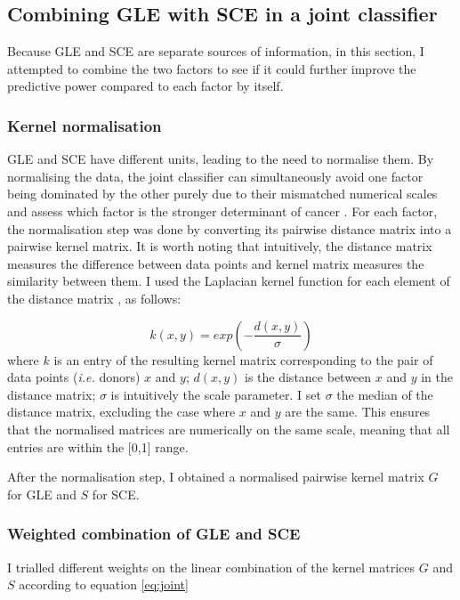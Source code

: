 \subsection{Combining GLE with SCE in a joint classifier}
Because GLE and SCE are separate sources of information, in this section, I attempted to combine the two factors to see if it could further improve the predictive power compared to each factor by itself.

\subsubsection{Kernel normalisation}
GLE and SCE have different units, leading to the need to normalise them. By normalising the data, the joint classifier can simultaneously avoid one factor being dominated by the other purely due to their mismatched numerical scales and assess which factor is the stronger determinant of cancer . For each factor, the normalisation step was done by converting its pairwise distance matrix into a pairwise kernel matrix. It is worth noting that intuitively, the distance matrix measures the difference between data points and kernel matrix measures the similarity between them. I used the Laplacian kernel function for each element of the distance matrix \citep{Wang2016ApplicationFunction}, as follows:

\begin{equation}
    k(x,y) = exp( - \frac{d(x,y)}{\sigma})
    \label{eq:laplacian}
\end{equation}
where $k$ is an entry of the resulting kernel matrix corresponding to the pair of data points (\textit{i.e.} donors) $x$ and $y$; $d(x,y)$ is the distance between $x$ and $y$ in the distance matrix; $\sigma$ is intuitively the scale parameter. I set $\sigma$ the median of the distance matrix, excluding the case where $x$ and $y$ are the same. This ensures that the normalised matrices are numerically on the same scale, meaning that all entries are within the [0,1] range.

After the normalisation step, I obtained a normalised pairwise kernel matrix $G$ for GLE and $S$ for SCE.

\subsubsection{Weighted combination of GLE and SCE}
I trialled different weights on the linear combination of the kernel matrices $G$ and $S$ according to equation \ref{eq:joint}

